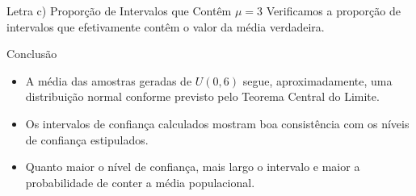 \begin{frame}[fragile]{Letra c) Proporção de Intervalos que Contêm $\mu = 3$}
Verificamos a proporção de intervalos que efetivamente contêm o valor da média verdadeira.

\vspace{0.3em}

\end{frame}

\begin{frame}{Conclusão}
\begin{itemize}
  \item A média das amostras geradas de $U(0,6)$ segue, aproximadamente, uma distribuição normal conforme previsto pelo Teorema Central do Limite.
  \item Os intervalos de confiança calculados mostram boa consistência com os níveis de confiança estipulados.
  \item Quanto maior o nível de confiança, mais largo o intervalo e maior a probabilidade de conter a média populacional.
\end{itemize}
\end{frame}
